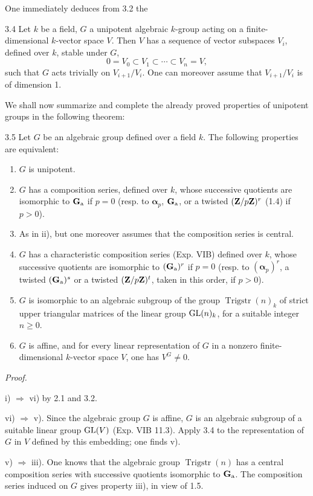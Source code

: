 One immediately deduces from 3.2 the
\begin{corollary}{3.4}\label{XVII.3.4}
Let $k$ be a field, $G$ a unipotent algebraic $k$-group acting on a finite-dimensional $k$-vector space $V$. Then $V$ has a sequence of vector subspaces $V_i$, defined over $k$, stable under $G$,
\[
 0=V_0\subset V_1\subset\cdots\subset V_n=V,
\]
such that $G$ acts trivially on $V_{i+1}/V_i$. One can moreover assume that $V_{i+1}/V_i$ is of dimension 1.
\end{corollary}
We shall now summarize and complete the already proved properties of unipotent groups in the following theorem:
\begin{theorem}{3.5}\label{XVII.3.5}
Let $G$ be an algebraic group defined over a field $k$. The following properties are equivalent:
\begin{enumerate}[label=\textup{\roman*)}]
\item $G$ is unipotent.
\item $G$ has a composition series, defined over $k$, whose successive quotients are isomorphic to $\mathbf{G}_{\mathrm{a}}$ if $p=0$ (resp. to $\boldsymbol\alpha_p$, $\mathbf{G}_{\mathrm{a}}$, or a twisted $(\mathbf{Z}/p\mathbf{Z})^r$ (1.4) if $p>0$).
\item As in ii), but one moreover assumes that the composition series is central.
\item $G$ has a characteristic composition series (Exp. VIB) defined over $k$, whose successive quotients are isomorphic to $(\mathbf{G}_{\mathrm{a}})^r$ if $p=0$ (resp. to $(\boldsymbol\alpha_p)^r$, a twisted $(\mathbf{G}_{\mathrm{a}})^s$ or a twisted $(\mathbf{Z}/p\mathbf{Z})^t$, taken in this order, if $p>0$).
\item $G$ is isomorphic to an algebraic subgroup of the group $\operatorname{Trigstr}(n)_k$ of strict upper triangular matrices of the linear group $\operatorname{GL}(n)_k$, for a suitable integer $n\geq0$.
\item $G$ is affine, and for every linear representation of $G$ in a nonzero finite-dimensional $k$-vector space $V$, one has $V^G\neq0$.
\end{enumerate}
\end{theorem}
\noindent\emph{Proof.}

\noindent i) $\Rightarrow$ vi) by 2.1 and 3.2.

\noindent vi) $\Rightarrow$ v). Since the algebraic group $G$ is affine, $G$ is an algebraic subgroup of a suitable linear group $\operatorname{GL}(V)$ (Exp. VIB 11.3). Apply 3.4 to the representation of $G$ in $V$ defined by this embedding; one finds v).

\noindent v) $\Rightarrow$ iii). One knows that the algebraic group $\operatorname{Trigstr}(n)$ has a central composition series with successive quotients isomorphic to $\mathbf{G}_{\mathrm{a}}$. The composition series induced on $G$ gives property iii), in view of 1.5.

